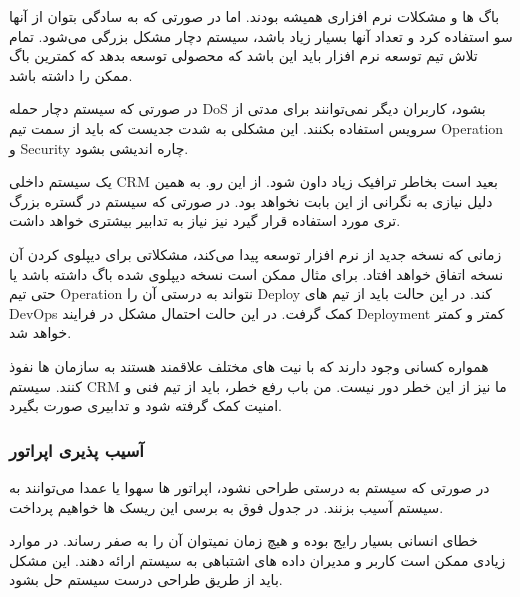 
باگ ها و مشکلات نرم افزاری همیشه بودند. اما در صورتی که به سادگی بتوان از آنها سو استفاده کرد و تعداد آنها بسیار زیاد باشد، سیستم دچار مشکل بزرگی می‌شود.
تمام تلاش تیم توسعه نرم افزار باید این باشد که محصولی توسعه بدهد که کمترین باگ ممکن را داشته باشد.


در صورتی که سیستم دچار حمله DoS بشود، کاربران دیگر نمی‌توانند برای مدتی از سرویس استفاده بکنند. این مشکلی به شدت جدیست که باید از سمت
تیم Operation و Security چاره اندیشی بشود.


یک سیستم داخلی CRM بعید است بخاطر ترافیک زیاد داون شود. از این رو. به همین دلیل نیازی به نگرانی از این بابت نخواهد بود. در صورتی که سیستم در گستره بزرگ تری
مورد استفاده قرار گیرد نیز نیاز به تدابیر بیشتری خواهد داشت.


زمانی که نسخه جدید از نرم افزار توسعه پیدا می‌کند، مشکلاتی برای دیپلوی کردن آن نسخه اتفاق خواهد افتاد. برای مثال ممکن است  نسخه دیپلوی شده باگ داشته باشد
یا حتی تیم Operation نتواند به درستی آن را Deploy کند. در این حالت باید از تیم های DevOps کمک گرفت. در این حالت احتمال مشکل در فرایند Deployment
کمتر و کمتر خواهد شد.


همواره کسانی وجود دارند که با نیت های مختلف علاقمند هستند به سازمان ها نفوذ کنند. سیستم CRM ما نیز از این خطر دور نیست. من باب رفع خطر، باید از تیم فنی و امنیت 
کمک گرفته شود و تدابیری صورت بگیرد.

\subsubsection{آسیب پذیری اپراتور}
در صورتی که سیستم به درستی طراحی نشود، اپراتور ها سهوا یا عمدا می‌توانند به سیستم آسیب بزنند. در جدول فوق به برسی این ریسک ها خواهیم پرداخت.


خطای انسانی بسیار رایج بوده و هیچ زمان نمیتوان آن را به صفر رساند. در موارد زیادی ممکن است کاربر و مدیران داده های اشتباهی به سیستم ارائه دهند.
این مشکل باید از طریق طراحی درست سیستم حل بشود.


